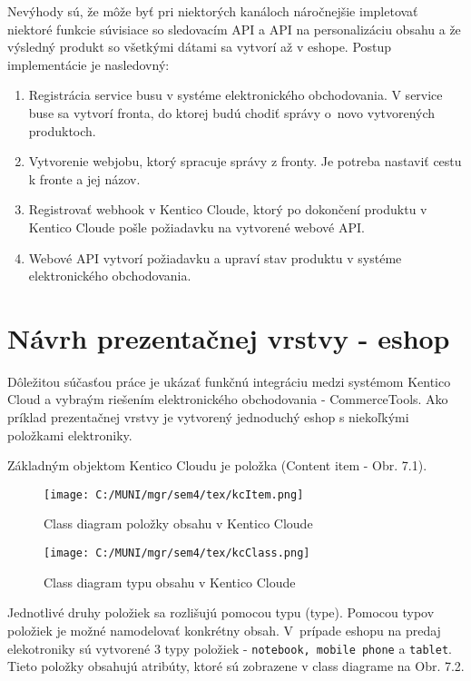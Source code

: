 \documentclass[
  printed, %
  table,   %
  lof,     %
  nolot,     %
  twoside,  
]{fithesis3}
\begin{document}
Nevýhody sú, že môže byť pri niektorých kanáloch náročnejšie impletovať niektoré funkcie súvisiace so sledovacím API a API na personalizáciu obsahu a že výsledný produkt so všetkými dátami sa vytvorí až v eshope.
Postup implementácie je nasledovný:
\begin{enumerate}
	\item Registrácia service busu v systéme elektronického obchodovania. V service buse sa vytvorí fronta, do ktorej budú chodiť správy o~novo vytvorených produktoch.
	\item Vytvorenie webjobu, ktorý spracuje správy z fronty. Je potreba nastaviť cestu k fronte a jej názov.
	\item Registrovať webhook v Kentico Cloude, ktorý po dokončení produktu v Kentico Cloude pošle požiadavku na vytvorené webové API.
	\item Webové API vytvorí požiadavku a upraví stav produktu v systéme elektronického obchodovania.
\end{enumerate}

\chapter{Návrh prezentačnej vrstvy - eshop}
Dôležitou súčasťou práce je ukázať funkčnú integráciu medzi systémom Kentico Cloud a vybraým riešením elektronického obchodovania - CommerceTools. Ako príklad prezentačnej vrstvy je vytvorený jednoduchý eshop s niekoľkými položkami elektroniky. 

Základným objektom Kentico Cloudu je položka (Content item - Obr. 7.1).

\begin{figure}[h]
  \begin{center}
        \texttt{[image: C:/MUNI/mgr/sem4/tex/kcItem.png]}
  \end{center}
  \caption{Class diagram položky obsahu v Kentico Cloude}
  \label{fig:kentico item}
\end{figure}
\begin{figure}[h]
  \begin{center}
        \texttt{[image: C:/MUNI/mgr/sem4/tex/kcClass.png]}
  \end{center}
  \caption{Class diagram typu obsahu v Kentico Cloude}
  \label{fig:kentico class}
\end{figure}

Jednotlivé druhy položiek sa rozlišujú pomocou typu (type). Pomocou typov položiek je možné namodelovať konkrétny obsah. V~prípade eshopu na predaj elekotroniky sú vytvorené 3 typy položiek - \texttt{notebook, mobile phone} a \texttt{tablet}. Tieto položky obsahujú atribúty, ktoré sú zobrazene v class diagrame na Obr. 7.2. 
\end{document}
